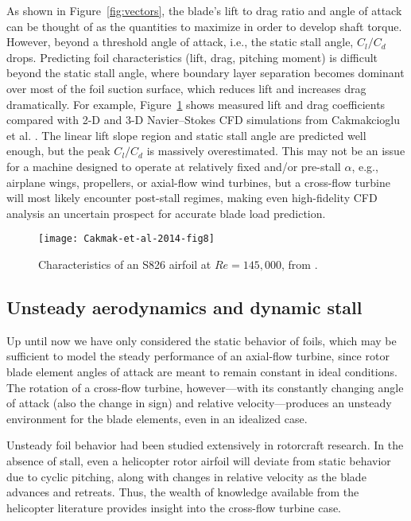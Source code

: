 As shown in Figure~\ref{fig:vectors}, the blade's lift to drag ratio and angle
of attack can be thought of as the quantities to maximize in order to develop
shaft torque. However, beyond a threshold angle of attack, i.e., the static
stall angle, $C_l/C_d$ drops. Predicting foil characteristics (lift, drag,
pitching moment) is difficult beyond the static stall angle, where boundary
layer separation becomes dominant over most of the foil suction surface, which
reduces lift and increases drag dramatically. For example,
Figure~\ref{fig:S826-perf} shows measured lift and drag coefficients compared
with 2-D and 3-D Navier--Stokes CFD simulations from Cakmakcioglu et al.
\cite{Cakmakcioglu2014}. The linear lift slope region and static stall angle are
predicted well enough, but the peak $C_l/C_d$ is massively overestimated. This
may not be an issue for a machine designed to operate at relatively fixed and/or
pre-stall $\alpha$, e.g., airplane wings, propellers, or axial-flow wind
turbines, but a cross-flow turbine will most likely encounter post-stall
regimes, making even high-fidelity CFD analysis an uncertain prospect for
accurate blade load prediction.

\begin{figure}
    \centering
    
    \texttt{[image: Cakmak-et-al-2014-fig8]}
    
    \caption{Characteristics of an S826 airfoil at $Re=145,000$, from
        \cite{Cakmakcioglu2014}.}
    
    \label{fig:S826-perf}
\end{figure}


\subsection{Unsteady aerodynamics and dynamic stall}

Up until now we have only considered the static behavior of foils, which may be
sufficient to model the steady performance of an axial-flow turbine, since rotor
blade element angles of attack are meant to remain constant in ideal conditions.
The rotation of a cross-flow turbine, however---with its constantly changing
angle of attack (also the change in sign) and relative velocity---produces an
unsteady environment for the blade elements, even in an idealized case.

Unsteady foil behavior had been studied extensively in rotorcraft research. In
the absence of stall, even a helicopter rotor airfoil will deviate from static
behavior due to cyclic pitching, along with changes in relative velocity as the
blade advances and retreats. Thus, the wealth of knowledge available from the
helicopter literature provides insight into the cross-flow turbine case.

